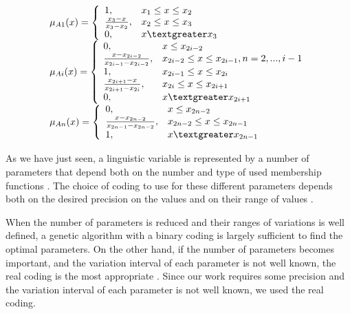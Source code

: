 \documentclass[runningheads,a4paper]{llncs}
\begin{document}
\begin{equation} 
\begin{tabular}{l}
$\mu_{A1}(x)=  \left \{
\begin{array}{ll}
1, &x_{1} \leq x \leq x_{2}\\
\frac{x_{3} - x}{x_{3} - x_{2}}, &x_{2} \leq x \leq x_{3}\\
0        , &x \textgreater x_{3}\\
\end{array} 
\right.$		\\ 	
$\mu_{Ai}(x)= \left \{
\begin{array}{ll} 
0, &x \leq x_{2i-2}\\
\frac{x - x_{2i-2}}{x_{2i-1} - x_{2i-2}}, &x_{2i-2} \leq x \leq x_{2i-1},n=2,...,i-1\\
1, & x_{2i-1} \leq x \leq x_{2i}\\
\frac{x_{2i+1} - x}{x_{2i+1} - x_{2i}},& x_{2i} \leq x \leq x_{2i+1}\\
0  , &x \textgreater x_{2i+1}\\
\end{array}  
\right.	$		\\
$\mu_{An}(x)= \left \{
\begin{array}{ll} 
0, &x \leq x_{2n-2}\\
\frac{x - x_{2n-2}}{x_{2n-1} - x_{2n-2}},& x_{2n-2} \leq x \leq x_{2n-1}\\
1 ,& x \textgreater x_{2n-1} 
\end{array} 
\right.$\\
\label{eq:e1}
\end{tabular}
\end{equation}
	
As we have just seen, a linguistic variable is represented by a number of parameters that depend both on the number and type of used membership functions  \cite{ThangG08}. The choice of coding to use for these different parameters depends both on the desired precision on the values and on their range of values \cite{ThangG08}.

When the number of parameters is reduced and their ranges of variations is well defined, a genetic algorithm with a binary coding is largely sufficient to find the optimal parameters. On the other hand, if the number of parameters becomes important, and the variation interval of each parameter is not well known, the real coding is the most appropriate \cite{elsayed13}. 
Since our work requires some precision and the variation interval of each parameter is not well known, we used the real coding.
\end{document}
